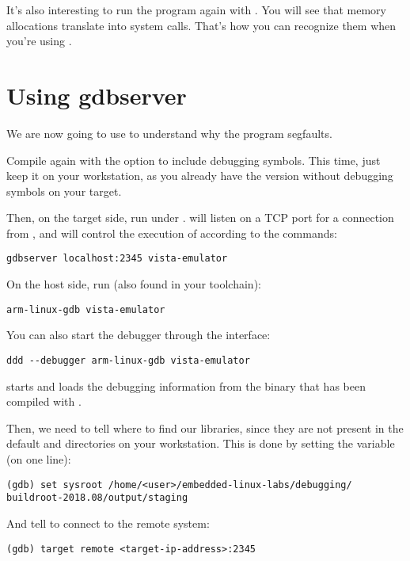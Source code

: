 It's also interesting to run the program again with . You
will see that memory allocations translate into  system 
calls. That's how you can recognize them when you're using
.

\section{Using gdbserver}

We are now going to use  to understand why the program
segfaults.

Compile  again with the  option to
include debugging symbols. This time, just keep it on your workstation,
as you already have the version without debugging symbols on your target.

Then, on the target side, run  under
.  will listen on a TCP port for a
connection from , and will control the execution of
 according to the  commands:

\begin{verbatim}
gdbserver localhost:2345 vista-emulator
\end{verbatim}

On the host side, run  (also found in your toolchain):
\begin{verbatim}
arm-linux-gdb vista-emulator
\end{verbatim}

You can also start the debugger through the  interface:
\begin{verbatim}
ddd --debugger arm-linux-gdb vista-emulator
\end{verbatim}

 starts and loads the debugging information from the
 binary that has been compiled with .

Then, we need to tell where to find our libraries, since they are not
present in the default  and  directories on
your workstation. This is done by setting the  
variable (on one line):

\begin{verbatim}
(gdb) set sysroot /home/<user>/embedded-linux-labs/debugging/
buildroot-2018.08/output/staging
\end{verbatim}

And tell  to connect to the remote system:
\begin{verbatim}
(gdb) target remote <target-ip-address>:2345
\end{verbatim}

